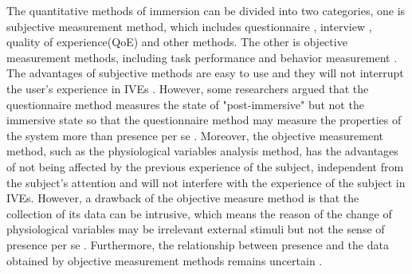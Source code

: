 \documentclass[sigconf]{acmart}
\begin{document}

The quantitative methods of immersion can be divided into two categories, one is subjective measurement method, which includes questionnaire \cite{witmer1998measuring, Catena00usingpresence, nakamura2014concept, Schubert01theexperience}, interview \cite{Seligman00positivepsychology:}, quality of experience(QoE) \cite {Zhang2017Spatial} and other methods. The other is objective measurement methods, including task performance \cite{Schloerb1995A} and behavior measurement \cite{ijsselsteijn2000presence}. The advantages of subjective methods are easy to use \cite{kuschel2007presence} and they will not interrupt the user's experience in IVEs \cite{ijsselsteijn2000presence, inbook, Wissmath2010Measuring}. However, some researchers argued that the questionnaire method measures the state of "post-immersive" but not the immersive state so that the questionnaire method may measure the properties of the system more than presence per se \cite{steuer1992defining, witmer1998measuring}. Moreover, the objective measurement method, such as the physiological variables analysis method, has the advantages of not being affected by the previous experience of the subject, independent from the subject's attention and will not interfere with the experience of the subject in IVEs. However, a drawback of the objective measure method is that the collection of its data can be intrusive, which means the reason of the change of physiological variables may be irrelevant external stimuli but not the sense of presence per se \cite{van2004measuring}. Furthermore, the relationship between presence and the data obtained by objective measurement methods remains uncertain \cite{Wissmath2010Measuring,kim1997telepresence}.
\end{document}
